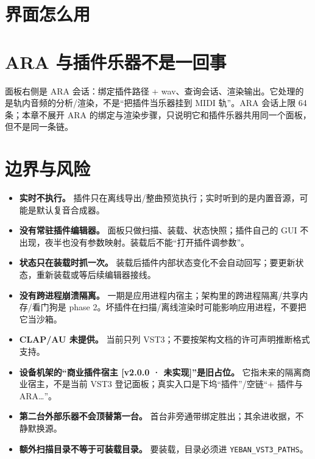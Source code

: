 \section{界面怎么用}




\section{ARA 与插件乐器不是一回事}

面板右侧是 ARA 会话：绑定插件路径 + wav、查询会话、渲染输出。它处理的是轨内音频的分析/渲染，不是“把插件当乐器挂到 MIDI 轨”。ARA 会话上限 64 条；本章不展开 ARA 的绑定与渲染步骤，只说明它和插件乐器共用同一个面板，但不是同一条链。

\section{边界与风险}

\begin{itemize}
  \item \textbf{实时不执行。} 插件只在离线导出/整曲预览执行；实时听到的是内置音源，可能是默认复音合成器。
  \item \textbf{没有常驻插件编辑器。} 面板只做扫描、装载、状态快照；插件自己的 GUI 不出现，夜半也没有参数映射。装载后不能“打开插件调参数”。
  \item \textbf{状态只在装载时抓一次。} 装载后插件内部状态变化不会自动回写；要更新状态，重新装载或等后续编辑器接线。
  \item \textbf{没有跨进程崩溃隔离。} 一期是应用进程内宿主；架构里的跨进程隔离/共享内存/看门狗是 phase 2。坏插件在扫描/离线渲染时可能影响应用进程，不要把它当沙箱。
  \item \textbf{CLAP/AU 未提供。} 当前只列 VST3；不要按架构文档的许可声明推断格式支持。
  \item \textbf{设备机架的“商业插件宿主 [v2.0.0 · 未实现]”是旧占位。} 它指未来的隔离商业宿主，不是当前 VST3 登记面板；真实入口是下坞“插件”/空链“+ 插件与 ARA…”。
  \item \textbf{第二台外部乐器不会顶替第一台。} 首台非旁通带绑定胜出；其余进收据，不静默换源。
  \item \textbf{额外扫描目录不等于可装载目录。} 要装载，目录必须进 \texttt{YEBAN\_VST3\_PATHS}。
\end{itemize}

